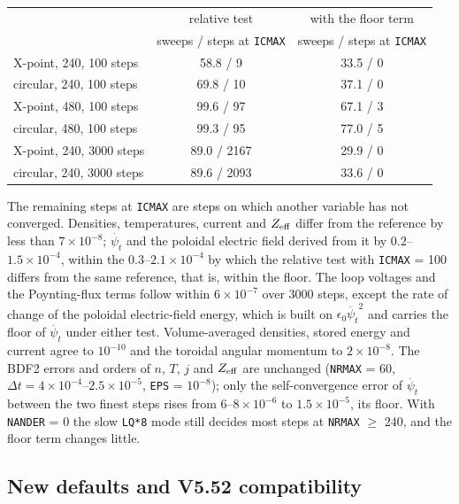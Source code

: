 \documentclass[11pt]{article}
\def\r#1{{\rm#1}}
\def\psit{\psi_t}
\def\psitd{\dot{\psit}}
\begin{document}
\begin{center}
\begin{tabular}{|l|c|c|}\hline
 & relative test & with the floor term \\
 & sweeps / steps at \texttt{ICMAX} & sweeps / steps at \texttt{ICMAX} \\\hline
X-point, 240, 100 steps       & 58.8 / 9    & 33.5 / 0 \\
circular, 240, 100 steps      & 69.8 / 10   & 37.1 / 0 \\
X-point, 480, 100 steps       & 99.6 / 97   & 67.1 / 3 \\
circular, 480, 100 steps      & 99.3 / 95   & 77.0 / 5 \\
X-point, 240, 3000 steps      & 89.0 / 2167 & 29.9 / 0 \\
circular, 240, 3000 steps     & 89.6 / 2093 & 33.6 / 0 \\\hline
\end{tabular}
\end{center}

The remaining steps at \texttt{ICMAX} are steps on which another variable has not
converged.  Densities, temperatures, current and $Z_\r{eff}$ differ from the
reference by less than $7\times10^{-8}$; $\psitd$ and the poloidal electric field derived from it by
$0.2$--$1.5\times10^{-4}$, within the $0.3$--$2.1\times10^{-4}$ by which the
relative test with \texttt{ICMAX} = 100 differs from the same reference, that is,
within the floor.  The loop voltages and the Poynting-flux terms follow within
$6\times10^{-7}$ over 3000 steps, except the rate of change of the poloidal
electric-field energy, which is built on $\epsilon_0\psitd^2$ and carries the floor
of $\psitd$ under either test.  Volume-averaged densities, stored energy and
current agree to $10^{-10}$ and the toroidal angular momentum to $2\times10^{-8}$.
The BDF2 errors and orders of $n$, $T$, $j$ and $Z_\r{eff}$ are unchanged
(\texttt{NRMAX} = 60, $\Delta t = 4\times10^{-4}$--$2.5\times10^{-5}$,
\texttt{EPS} = $10^{-8}$); only the self-convergence error of $\psitd$ between
the two finest steps rises from $6$--$8\times10^{-6}$ to $1.5\times10^{-5}$, its
floor.  With \texttt{NANDER} = 0 the slow \texttt{LQ*8} mode still decides most
steps at \texttt{NRMAX} $\ge$ 240, and the floor term changes little.

\subsection{New defaults and V5.52 compatibility}
\end{document}

